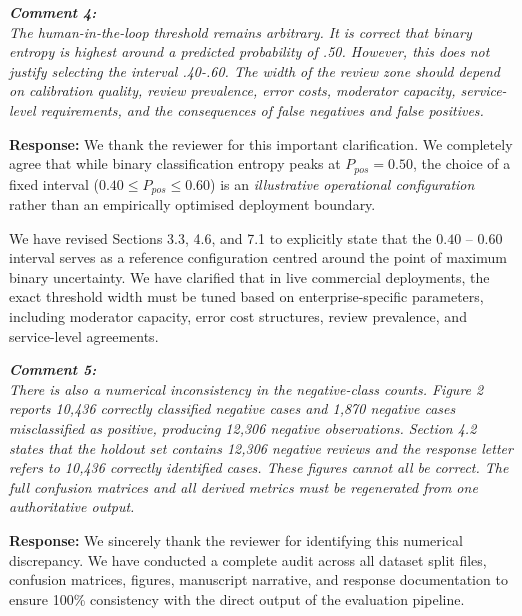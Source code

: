 \documentclass[11pt]{article}
\newcommand{\comment}[1]{\vspace{12pt}\noindent\colorbox{gray!10}{\parbox{\dimexpr\textwidth-2\fboxsep\relax}{\color{commentcolor}\itshape #1}}\vspace{6pt}}
\newcommand{\response}{\vspace{6pt}\noindent\textbf{Response: }}
\begin{document}
\comment{\textbf{Comment 4:} \\
The human-in-the-loop threshold remains arbitrary. It is correct that binary entropy is highest around a predicted probability of .50. However, this does not justify selecting the interval .40-.60. The width of the review zone should depend on calibration quality, review prevalence, error costs, moderator capacity, service-level requirements, and the consequences of false negatives and false positives.}

\response
We thank the reviewer for this important clarification. We completely agree that while binary classification entropy peaks at $P_{pos} = 0.50$, the choice of a fixed interval ($0.40 \le P_{pos} \le 0.60$) is an \textit{illustrative operational configuration} rather than an empirically optimised deployment boundary.

We have revised Sections 3.3, 4.6, and 7.1 to explicitly state that the $0.40$ -- $0.60$ interval serves as a reference configuration centred around the point of maximum binary uncertainty. We have clarified that in live commercial deployments, the exact threshold width must be tuned based on enterprise-specific parameters, including moderator capacity, error cost structures, review prevalence, and service-level agreements.

\comment{\textbf{Comment 5:} \\
There is also a numerical inconsistency in the negative-class counts. Figure 2 reports 10,436 correctly classified negative cases and 1,870 negative cases misclassified as positive, producing 12,306 negative observations. Section 4.2 states that the holdout set contains 12,306 negative reviews and the response letter refers to 10,436 correctly identified cases. These figures cannot all be correct. The full confusion matrices and all derived metrics must be regenerated from one authoritative output.}

\response
We sincerely thank the reviewer for identifying this numerical discrepancy. We have conducted a complete audit across all dataset split files, confusion matrices, figures, manuscript narrative, and response documentation to ensure 100\% consistency with the direct output of the evaluation pipeline.
\end{document}
